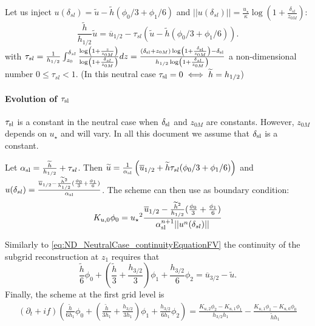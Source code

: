Let us inject $u(\delta_{sl}) = \widetilde{u} - \widetilde{h}(\phi_0/3 + \phi_1/6)$ and $||u(\delta_{sl})|| = \frac{{u_\star}}{\kappa}\log(1+\frac{\delta_{sl}}{z_{0M}})$:
\begin{equation}
\frac{\widetilde{h}}{h_{1/2}}\widetilde{u} = \overline{u}_{1/2} - \tau_{sl}\left(\widetilde{u} - \widetilde{h}(\phi_0/3 + \phi_1/6)\right).
\end{equation}
with $\tau_{sl} = \frac{1}{{h_{1/2}}}\int_{z_0}^{\delta_{sl}} \frac{\log(1+\frac{z}{z_{0M}})}{\log(1+\frac{\delta_{sl}}{z_{0M}})} dz =
\frac{(\delta_{\rm sl} + z_{0M})\log(1+\frac{\delta_{\rm sl}}{z_{0M}}) - \delta_{\rm sl}}{h_{1/2}\log(1+\frac{\delta_{sl}}{z_{0M}})}$ a non-dimensional number $0 \leq\tau_{sl} < 1$. (In this neutral case $\tau_{\rm sl} = 0 \iff \widetilde{h}=h_{1/2}$)

\paragraph{Evolution of $\tau_{\rm sl}$}
$\tau_{\rm sl}$ is a constant in the neutral case
when $\delta_{\rm sl}$ and $z_{0M}$ are constants. However,
$z_{0M}$ depends on $u_\star$ and will vary.
In all this document we assume that $\delta_{\rm sl}$ is a constant.

Let $\alpha_{\rm sl} = \frac{\widetilde{h}}{h_{1/2}}+\tau_{sl}$.
Then $\widetilde{u} = \frac{1}{\alpha_{\rm sl}}\left(\overline{u}_{1/2} + \widetilde{h}\tau_{sl}(\phi_0/3 + \phi_1/6)\right)$
and $u(\delta_{sl})=\frac{\overline{u}_{1/2} - \frac{\widetilde{h}^2}{h_{1/2}}
(\frac{\phi_0}{3} + \frac{\phi_1}{6})}{\alpha_{\rm sl}}$.
The scheme can then use as boundary condition:
\begin{equation}
	\label{eq:ND_NeutralCase_boundaryCondFVfree}
	K_{u,0} \phi_0 = {u_\star}^2
	\frac{\overline{u}_{1/2} - \frac{\widetilde{h}^2}{h_{1/2}}(\frac{\phi_0}{3} + \frac{\phi_1}{6})}{\alpha_{\rm sl}^{n+1}||u^n(\delta_{sl})||}
\end{equation}

Similarly to \eqref{eq:ND_NeutralCase_continuityEquationFV}
the continuity of the subgrid reconstruction at $z_1$ requires that
\begin{equation}
	\label{eq:ND_NeutralCase_continuityFVfree}
    \frac{\widetilde{h}}{6} 
    \phi_0
    +
    (\frac{\widetilde{h}}{3} 
    + \frac{h_{3/2}}{3})
    \phi_1
    + \frac{h_{3/2}}{6} \phi_2
     = \overline{u}_{3/2} - 
     \widetilde{u}.
\end{equation}
Finally, the scheme at the first grid level is
\begin{equation}
	\label{eq:ND_NeutralCase_prognosticEqFVfree}
    \begin{aligned}
(\partial_t + if)
    \left(\frac{\widetilde{h}}{6h_1} 
    \phi_0
    +
    \left(
    \frac{\widetilde{h}}{3h_1} 
    + \frac{h_{3/2}}{3h_1}
    \right)
    \phi_1
    + \frac{h_{3/2}}{6h_1} \phi_2\right)
    =
	    \frac{K_{u,2} \phi_2 - K_{u,1} \phi_1}{h_{3/2}h_1} - \frac{K_{u,1} \phi_1 - K_{u,0} \phi_0 }{\widetilde{h}h_1}
    \end{aligned}
\end{equation}

